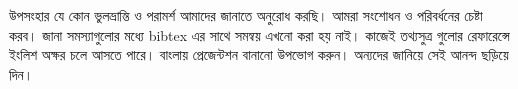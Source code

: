 \documentclass[xetex]{beamer}
\begin{document}
\begin{frame}{উপসংহার}
যে কোন ভুলভ্রান্তি ও পরামর্শ আমাদের জানাতে অনুরোধ করছি। আমরা সংশোধন ও পরিবর্ধনের চেষ্টা করব। জানা সমস্যাগুলোর মধ্যে {\rm bibtex} এর সাথে সমন্বয় এখনো করা হয় নাই। কাজেই তথ্যসুত্র গুলোর রেফারেন্সে ইংলিশ অক্ষর চলে আসতে পারে। বাংলায় প্রেজেন্টশন বানানো উপভোগ করুন। অন্যদের জানিয়ে সেই আনন্দ ছড়িয়ে দিন।
\end{frame}
\end{document}
